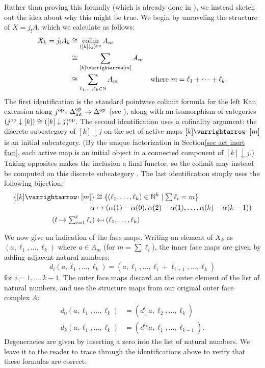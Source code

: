 \documentclass{conm-p-l}
\theoremstyle{definition}
\theoremstyle{remark}
\newcommand{\op}{\textup{op}}
\newcommand{\intrm}{\textup{int}}
\newcommand{\delint}{\Delta_\intrm}
\DeclareMathOperator*{\colim}{colim}
\newcommand{\ract}{\varrightarrow\mapsfromchar}
\begin{document}
Rather than proving this formally (which is already done in \cite{HackneyKock:FDS}), we instead sketch out the idea about why this might be true.
We begin by unraveling the structure of $X = j_!A$, which we calculate as follows:
\begin{align*}
X_k = j_!A_k &\cong \colim_{([k] \downarrow j)^\op} A_m \\
&\cong\sum_{ [k] \ract [m]} A_m \\
&\cong \sum_{\ell_1, \dots, \ell_k \in \mathbb{N}} A_m & \text{where } m= \ell_1 + \dots + \ell_k.
\end{align*}
The first identification is the standard pointwise colimit formula for the left Kan extension along $j^\op \colon \delint^\op \to \Delta^\op$ (see \cite[X.3]{MacLane:CWM}), along with an isomorphism of categories $(j^\op \downarrow [k]) \cong ([k] \downarrow j)^\op$.
The second identification uses a cofinality argument: the discrete subcategory of $[k] \downarrow j$ on the set of active maps $[k] \ract [m]$ is an initial subcategory. (By the unique factorization in Section\nobreakspace \ref {sec act inert fact}, each active map is an initial object in a connected component of $[k] \downarrow j$.)
Taking opposites makes the inclusion a final functor, so the colimit may instead be computed on this discrete subcategory \cite[IX.3]{MacLane:CWM}.
The last identification simply uses the following bijection:
\begin{align*}
\{ [k] \ract [m] \}  &\cong \{ (\ell_1, \dots, \ell_k) \in \mathbb{N}^k \mid \textstyle  \sum \ell_i = m \} \\
\alpha   &\mapsto (\alpha(1) - \alpha(0), \alpha(2) - \alpha(1), \dots, \alpha(k) - \alpha(k-1)) \\
\textstyle  ( t \mapsto \sum_{i=1}^t \ell_i ) &\mapsfrom (\ell_1, \dots, \ell_k) 
\end{align*}

We now give an indication of the face maps.
Writing an element of $X_k$ as $(a, \ell_1, \dots, \ell_k)$ where $a\in A_m$ (for $m = \sum \ell_i$), the inner face maps are given by adding adjacent natural numbers:
\[
  d_i(a, \ell_1, \dots, \ell_k) = (a, \ell_1, \dots, \ell_i + \ell_{i+1}, \dots, \ell_k) 
\]
for $i=1, \dots, k-1$.
The outer face maps discard an the outer element of the list of natural numbers, and use the structure maps from our original outer face complex $A$:
\begin{align*}
  d_0(a, \ell_1, \dots, \ell_k) &= (d_\bot^{\ell_1} a, \ell_2, \dots, \ell_k) \\
  d_k(a, \ell_1, \dots, \ell_k) &= (d_\top^{\ell_k} a, \ell_1, \dots, \ell_{k-1}).
\end{align*}
Degeneracies are given by inserting a zero into the list of natural numbers.
We leave it to the reader to trace through the identifications above to verify that these formulas are correct.
\end{document}
